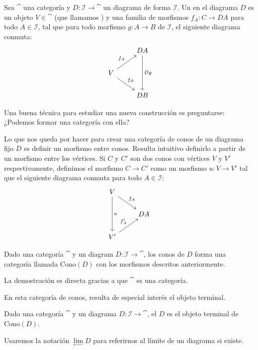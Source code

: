 \begin{definition}
Sea $\cat$ una categoría y $D \colon \mathcal{I} \to \cat$ un diagrama de forma $\mathcal{I}$.
Un  en el diagrama $D$ es un objeto $V \in \cat$ (que llamamos ) y una familia de morfismos $f_A \colon C \to D A$ para todo $A \in \mathcal{I}$, tal que para todo morfismo $g \colon A \to B$ de $\mathcal{I}$, el siguiente diagrama conmuta:
\[ \begin{tikzcd}
 & D A \arrow[dd,"D g"]\\
V \arrow[ur,"f_A"] \arrow[dr,"f_B"]\\
 & D B
\end{tikzcd} \]
\end{definition}

Una buena técnica para estudiar una nueva construcción es preguntarse: ¿Podemos formar una categoría con ella?

Lo que nos queda por hacer para crear una categoría de conos de un diagrama fijo $D$ es definir un morfismo entre conos.
Resulta intuitivo definirlo a partir de un morfismo entre los vértices.
Si $C$ y $C'$ son dos conos con vértices $V$ y $V'$ respectivamente, definimos el morfismo $C \to C'$ como un morfismo $u \colon V \to V'$ tal que el siguiente diagrama conmuta para todo $A \in \mathcal{I}$:
\[ \begin{tikzcd}
V \arrow[dr,"f_A"] \arrow[dd,"u"] &\\
 & D A\\
V' \arrow[ur,"f'_A"]
\end{tikzcd} \]

\begin{proposition}
Dado una categoría $\cat$ y un diagram $D \colon \mathcal{I} \to \cat$, los conos de $D$ forma una categoría llamada $\text{Cono}(D)$ con los morfismos descritos anteriormente.
\end{proposition}
La demostración es directa gracias a que $\cat$ es una categoría.

En esta categoría de conos, resulta de especial interés el objeto terminal.

\begin{definition}
Dado una categoría $\cat$ y un diagrama $D \colon \mathcal{I} \to \cat$, el  $D$ es el objeto terminal de $\text{Cono}(D)$.
\end{definition}

Usaremos la notación $\underset{\longleftarrow}\lim D$ para referirnos al límite de un diagrama si existe.

